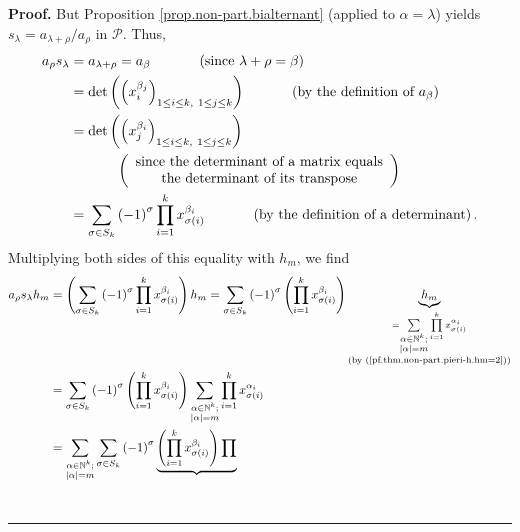 \documentclass[numbers=enddot,12pt,final,onecolumn,notitlepage]{scrartcl}%
\theoremstyle{definition}
\newenvironment{proof}[1][Proof]{\noindent\textbf{#1.} }{\ \rule{0.5em}{0.5em}}
\let\sumnonlimits\sum
\let\prodnonlimits\prod
\renewcommand{\sum}{\sumnonlimits\limits}
\renewcommand{\prod}{\prodnonlimits\limits}
\begin{document}
\begin{proof}
But Proposition \ref{prop.non-part.bialternant} (applied to $\alpha=\lambda$)
yields $s_{\lambda}=a_{\lambda+\rho}/a_{\rho}$ in $\mathcal{P}$. Thus,
\begin{align*}
a_{\rho}s_{\lambda}  &  =a_{\lambda+\rho}=a_{\beta}\ \ \ \ \ \ \ \ \ \ \left(
\text{since }\lambda+\rho=\beta\right) \\
&  =\det\left(  \left(  x_{i}^{\beta_{j}}\right)  _{1\leq i\leq k,\ 1\leq
j\leq k}\right)  \ \ \ \ \ \ \ \ \ \ \left(  \text{by the definition of
}a_{\beta}\right) \\
&  =\det\left(  \left(  x_{j}^{\beta_{i}}\right)  _{1\leq i\leq k,\ 1\leq
j\leq k}\right) \\
&  \ \ \ \ \ \ \ \ \ \ \left(
\begin{array}
[c]{c}%
\text{since the determinant of a matrix equals}\\
\text{the determinant of its transpose}%
\end{array}
\right) \\
&  =\sum_{\sigma\in S_{k}}\left(  -1\right)  ^{\sigma}\prod_{i=1}^{k}%
x_{\sigma\left(  i\right)  }^{\beta_{i}}\ \ \ \ \ \ \ \ \ \ \left(  \text{by
the definition of a determinant}\right)  .
\end{align*}
Multiplying both sides of this equality with $h_{m}$, we find%
\begin{align}
a_{\rho}s_{\lambda}h_{m}  &  =\left(  \sum_{\sigma\in S_{k}}\left(  -1\right)
^{\sigma}\prod_{i=1}^{k}x_{\sigma\left(  i\right)  }^{\beta_{i}}\right)
h_{m}=\sum_{\sigma\in S_{k}}\left(  -1\right)  ^{\sigma}\left(  \prod
_{i=1}^{k}x_{\sigma\left(  i\right)  }^{\beta_{i}}\right)  \underbrace{h_{m}%
}_{\substack{=\sum_{\substack{\alpha\in\mathbb{N}^{k};\\\left\vert
\alpha\right\vert =m}}\prod_{i=1}^{k}x_{\sigma\left(  i\right)  }^{\alpha_{i}%
}\\\text{(by (\ref{pf.thm.non-part.pieri-h.hm=2}))}}}\nonumber\\
&  =\sum_{\sigma\in S_{k}}\left(  -1\right)  ^{\sigma}\left(  \prod_{i=1}%
^{k}x_{\sigma\left(  i\right)  }^{\beta_{i}}\right)  \sum_{\substack{\alpha
\in\mathbb{N}^{k};\\\left\vert \alpha\right\vert =m}}\prod_{i=1}^{k}%
x_{\sigma\left(  i\right)  }^{\alpha_{i}}\nonumber\\
&  =\sum_{\substack{\alpha\in\mathbb{N}^{k};\\\left\vert \alpha\right\vert
=m}}\sum_{\sigma\in S_{k}}\left(  -1\right)  ^{\sigma}\underbrace{\left(
\prod_{i=1}^{k}x_{\sigma\left(  i\right)  }^{\beta_{i}}\right)  \prod
}
\end{align}
\end{proof}
\end{document}
